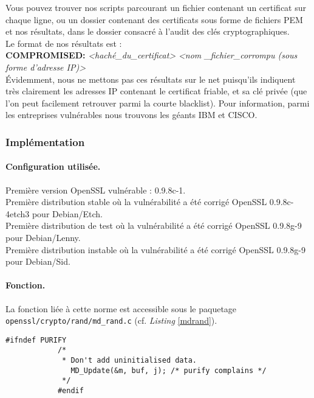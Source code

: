 			Vous pouvez trouver nos scripts parcourant un fichier contenant un certificat sur chaque ligne, ou un dossier contenant des certificats sous forme de fichiers PEM et nos résultats, dans le dossier consacré à l'audit des clés cryptographiques.\\
			
			Le format de nos résultats est : \\
			
			\textbf{COMPROMISED:} \textit{<haché\_du\_certificat>} \textit{<nom \_fichier\_corrompu (sous forme d'adresse IP)>}\\
			
			Évidemment, nous ne mettons pas ces résultats sur le net puisqu'ils indiquent très clairement les adresses IP contenant le certificat friable, et sa clé privée (que l'on peut facilement retrouver parmi la courte blacklist). Pour information, parmi les entreprises vulnérables nous trouvons les géants IBM et CISCO.
	
		\subsubsection{Implémentation}
						
			\paragraph{Configuration utilisée.\\}
			
			Première version OpenSSL vulnérable : 0.9.8c-1.\\
			Première distribution stable où la vulnérabilité a été corrigé OpenSSL 0.9.8c-4etch3 pour Debian/Etch.\\	
			Première distribution de test où la vulnérabilité a été corrigé OpenSSL 0.9.8g-9 pour Debian/Lenny.\\
			Première distribution instable où la vulnérabilité a été corrigé OpenSSL 0.9.8g-9 pour Debian/Sid.\\
			
						
			\paragraph{Fonction.\\} 
			
			La fonction liée à cette norme est accessible sous le paquetage \texttt{openssl/crypto/rand/md\_rand.c} (cf. \textit{Listing} \ref{mdrand}). 
			
			\begin{lstlisting}[style=customc,caption=md\_rand.c, label=mdrand]
			#ifndef PURIFY
			/*
			 * Don't add uninitialised data.
			   MD_Update(&m, buf, j); /* purify complains */
			 */
			#endif
			\end{lstlisting}
			
